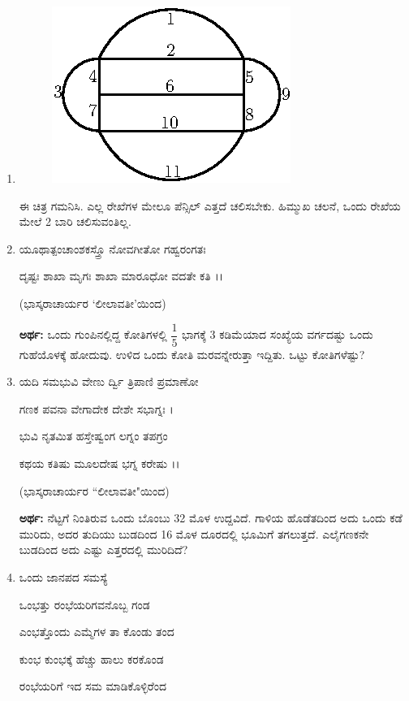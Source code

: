 \begin{enumerate}
\item 
\begin{figure}[!h]
\centering
\includegraphics{images/chap5/q20.eps}
\end{figure}

ಈ ಚಿತ್ರ ಗಮನಿಸಿ. ಎಲ್ಲ ರೇಖೆಗಳ ಮೇಲೂ ಪೆನ್ಸಿಲ್ ಎತ್ತದೆ ಚಲಿಸಬೇಕು. ಹಿಮ್ಮುಖ ಚಲನೆ, ಒಂದು ರೇಖೆಯ ಮೇಲೆ 2 ಬಾರಿ ಚಲಿಸುವಂತಿಲ್ಲ. 

\item ಯೂಥಾತ್ಪಂಚಾಂಶಕಸ್ತ್ರೊ ನೋವಗೀತೋ ಗಹ್ವರಂಗತಃ 

ದೃಷ್ಟಃ ಶಾಖಾ ಮೃಗಃ ಶಾಖಾ ಮಾರೂಧೋ ವದತೇ ಕತಿ ।।

\hfill (ಭಾಸ್ಕರಾಚಾರ್ಯರ `ಲೀಲಾವತೀ'ಯಿಂದ)


{\bf ಅರ್ಥ:} ಒಂದು ಗುಂಪಿನಲ್ಲಿದ್ದ ಕೋತಿಗಳಲ್ಲಿ $\dfrac{1}{5}$ ಭಾಗಕ್ಕೆ 3 ಕಡಿಮೆಯಾದ ಸಂಖ್ಯೆಯ ವರ್ಗದಷ್ಟು ಒಂದು ಗುಹೆಯೊಳಕ್ಕೆ ಹೋದುವು. ಉಳಿದ ಒಂದು ಕೋತಿ ಮರವನ್ನೇರುತ್ತಾ ಇದ್ದಿತು. ಒಟ್ಟು ಕೋತಿಗಳೆಷ್ಟು? 

\item ಯದಿ ಸಮಭುವಿ ವೇಣು ರ್ದ್ವಿ ತ್ರಿಪಾಣಿ ಪ್ರಮಾಣೋ 

ಗಣಕ ಪವನಾ ವೇಗಾದೇಕ ದೇಶೇ ಸಭಾಗ್ನಃ ।

ಭುವಿ ನೃತಮಿತ ಹಸ್ತೇಷ್ವಂಗ ಲಗ್ನಂ ತಪಗ್ರಂ 

ಕಥಯ ಕತಿಷು ಮೂಲದೇಷ ಭಗ್ನ ಕರೇಷು ।।
\begin{flushright}
(ಭಾಸ್ಕರಾಚಾರ್ಯರ ``ಲೀಲಾವತೀ"ಯಿಂದ)
\end{flushright}

{\bf ಅರ್ಥ:} ನೆಟ್ಟಗೆ ನಿಂತಿರುವ ಒಂದು ಬೊಂಬು 32 ಮೊಳ ಉದ್ದವಿದೆ. ಗಾಳಿಯ ಹೊಡೆತದಿಂದ ಅದು ಒಂದು ಕಡೆ ಮುರಿದು, ಅದರ ತುದಿಯು ಬುಡದಿಂದ 16 ಮೊಳ ದೂರದಲ್ಲಿ ಭೂಮಿಗೆ ತಗಲುತ್ತದೆ. ಎಲೈಗಣಕನೇ ಬುಡದಿಂದ ಅದು ಎಷ್ಟು ಎತ್ತರದಲ್ಲಿ ಮುರಿದಿದೆ? 

\item ಒಂದು ಜಾನಪದ ಸಮಸ್ಯೆ 

ಒಂಭತ್ತು ರಂಭೆಯರಿಗವನೊಬ್ಬ ಗಂಡ 

ಎಂಭತ್ತೊಂದು ಎಮ್ಮೆಗಳ ತಾ ಕೊಂಡು ತಂದ 

ಕುಂಭ ಕುಂಭಕ್ಕೆ ಹೆಚ್ಚು ಹಾಲು ಕರಕೊಂಡ 

ರಂಭೆಯರಿಗೆ ಇದ ಸಮ ಮಾಡಿಕೊಳ್ಳಿರೆಂದ 


\end{enumerate}
